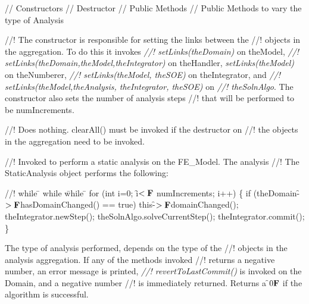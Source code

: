 \indent // Constructors
\indent // Destructor
\indent // Public Methods
\indent // Public Methods to vary the type of Analysis

//! The constructor is responsible for setting the links between the
//! objects in the aggregation. To do this it invokes {\em
//! setLinks(theDomain)} on \p theModel, {\em
//! setLinks(theDomain,theModel,theIntegrator)} on \p theHandler, 
{\em setLinks(theModel)} on \p theNumberer, {\em
//! setLinks(theModel, theSOE)} on \p theIntegrator, and  {\em
//! setLinks(theModel,theAnalysis, theIntegrator, theSOE)} on {\em
//! theSolnAlgo}.  The constructor also sets the number of analysis steps
//! that will be performed to be \p numIncrements.


//! Does nothing. clearAll() must be invoked if the destructor on
//! the objects in the aggregation need to be invoked.

//! Invoked to perform a static analysis on the FE\_Model. The analysis 
//! The StaticAnalysis object performs the following:
\begin{tabbing}
//! while \= \+ while \= while \= \kill
    for (int i=0; i\f$<{\bf F}$ numIncrements; i++) \{ \+
    if (theDomain-\f$>{\bf F}$hasDomainChanged() == true) \+
	this-\f$>{\bf F}$domainChanged(); \-
    theIntegrator.newStep();
    theSolnAlgo.solveCurrentStep();
    theIntegrator.commit(); \- \}
\end{tabbing}
\noindent The type of analysis performed, depends on the type of the
//! objects in the analysis aggregation. If any of the methods invoked
//! returns a negative number, an error message is printed, {\em
//! revertToLastCommit()} is invoked on the Domain, and a negative number
//! is immediately returned. Returns a \f$0{\bf F}$ if the algorithm is successful.

